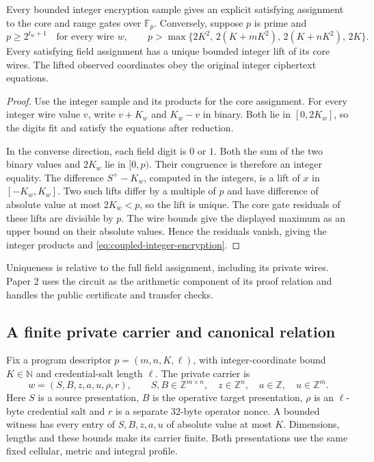 \begin{proposition}
\label{prop:coupled-field-refinement}
Every bounded integer encryption sample gives an explicit satisfying
assignment to the core and range gates over \(\mathbb F_p\). Conversely,
suppose \(p\) is prime and
\[
 p\ge 2^{t_w+1}\quad\text{for every wire }w,\qquad
 p>\max\{2K^2,\,2(K+mK^2),\,2(K+nK^2),\,2K\}.
\]
Every satisfying field assignment has a unique bounded integer lift of its
core wires. The lifted observed coordinates obey the original integer
ciphertext equations.
\end{proposition}

\begin{proof}
Use the integer sample and its products for the core assignment.
For every integer wire value \(v\), write \(v+K_w\) and \(K_w-v\) in
binary. Both lie in \([0,2K_w]\), so the digits fit and satisfy the
equations after reduction.

In the converse direction, each field digit is \(0\) or \(1\).
Both the sum of the two binary values and \(2K_w\) lie in \([0,p)\).
Their congruence is therefore an integer equality.
The difference \(S^+-K_w\), computed in the integers, is a lift of \(x\)
in \([-K_w,K_w]\). Two such lifts differ by a multiple of \(p\) and have
difference of absolute value at most \(2K_w<p\), so the lift is unique.
The core gate residuals of these lifts are divisible by \(p\).
The wire bounds give the displayed maximum as an upper bound on their
absolute values. Hence the residuals vanish, giving the integer products
and \eqref{eq:coupled-integer-encryption}.
\end{proof}

Uniqueness is relative to the full field assignment, including its private
wires. Paper 2 uses the circuit as the arithmetic component of its proof
relation and handles the public certificate and transfer checks.

\subsection{A finite private carrier and canonical relation}
\label{sec:coupled-finite-carrier}

Fix a program descriptor \(p=(m,n,K,\ell)\), with integer-coordinate bound
\(K\in\mathbb N\) and credential-salt length \(\ell\). The private carrier is
\[
 w=(S,B,z,a,u,\rho,r),\qquad
 S,B\in\mathbb Z^{m\times n},\quad z\in\mathbb Z^n,\quad
 a\in\mathbb Z,\quad u\in\mathbb Z^m.
\]
Here \(S\) is a source presentation, \(B\) is the operative target
presentation, \(\rho\) is an \(\ell\)-byte credential salt and \(r\) is a
separate 32-byte operator nonce. A bounded witness has every entry of
\(S,B,z,a,u\) of absolute value at most \(K\). Dimensions, lengths and these
bounds make its carrier finite. Both presentations use the same fixed
cellular, metric and integral profile.

